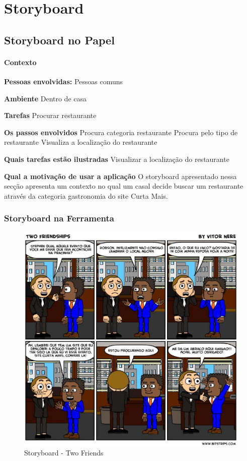 \chapter[Storyboard]{Storyboard}

\section{Storyboard no Papel}

\subsubsection{Contexto}

\textbf{Pessoas envolvidas:} 
	Pessoas comuns

\textbf{Ambiente}
	Dentro de casa

\textbf{Tarefas}
	Procurar restaurante

\textbf{Os passos envolvidos}
	Procura categoria restaurante
	Procura pelo tipo de restaurante
	Visualiza a localização do restaurante

\textbf{Quais tarefas estão ilustradas}
Visualizar a localização do restaurante

\textbf{Qual a motivação de usar a aplicação}
	O storyboard apresentado nessa secção apresenta um contexto no qual um casal decide buscar um restaurante através da categoria gastronomia do site Curta Mais.

\subsection{Storyboard na Ferramenta}

\begin{figure}[H]
	\begin{center}
		\includegraphics[keepaspectratio,scale=0.6]{figuras/bitstrip.eps}
		\caption{Storyboard - Two Friends}
	\end{center}
\end{figure}

